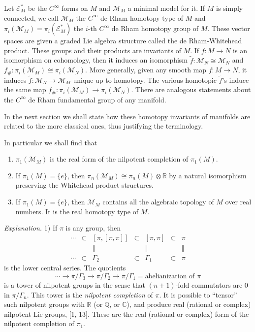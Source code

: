 \documentclass[
  english,
  a3paper,
  a3paper]{extarticle}
\begin{document}
Let \(\mathscr E_M^*\) be the \(C^\infty\) forms on \(M\) and
\(\mathcal M_M\) a minimal model for it. If \(M\) is simply connected,
we call \(\mathcal M_M\) the \(C^\infty\) de Rham homotopy type of \(M\)
and \(\pi_i(\mathcal M_M)=\pi_i(\mathscr E_M^*)\) the \(i\)-th
\(C^\infty\) de Rham homotopy group of \(M\). These vector spaces are
given a graded Lie algebra structure called the de Rham-Whitehead
product. These groups and their products are invariants of \(M\). If
\(f:M\to N\) is an isomorphism on cohomology, then it induces an
isomorphism \(\tilde f:\mathcal M_N\cong\mathcal M_N\) and
\(f_\#:\pi_i(\mathcal M_M)\cong\pi_i(\mathcal M_N)\). More generally,
given any smooth map \(f:M\to N\), it induces
\(\tilde f:\mathcal M_N\to\mathcal M_M\) unique up to homotopy. The
various homotopic \(\tilde f\)'s induce the same map
\(f_\#:\pi_i(\mathcal M_M)\to\pi_i(\mathcal M_N)\). There are analogous
statements about the \(C^\infty\) de Rham fundamental group of any
manifold.

In the next section we shall state how these homotopy invariants of
manifolds are related to the more classical ones, thus justifying the
terminology.

In particular we shall find that

\begin{enumerate}
\def\labelenumi{\arabic{enumi})}
\item
  \(\pi_1(\mathcal M_M)\) is the real form of the nilpotent completion
  of \(\pi_1(M)\).
\item
  If \(\pi_1(M)=\{e\}\), then
  \(\pi_n(\mathcal M_M)\cong\pi_n(M)\otimes\mathbb R\) by a natural
  isomorphism preserving the Whitehead product structures.
\item
  If \(\pi_1(M)=\{e\}\), then \(\mathcal M_M\) contains all the
  algebraic topology of \(M\) over real numbers. It is the real homotopy
  type of \(M\).
\end{enumerate}

\emph{Explanation.} 1) If \(\pi\) is any group, then \[
\begin{array}{ccccccc}
\cdots&\subset&[\pi,[\pi,\pi]]&\subset&[\pi,\pi]&\subset&\pi\\
&&\Vert&&\Vert&&\Vert\\
\cdots&\subset&\Gamma_2&\subset&\Gamma_1&\subset&\pi
\end{array}
\] is the lower central series. The quotients \[
\cdots\to\pi/\Gamma_3\to\pi/\Gamma_2\to\pi/\Gamma_1=\text{abelianization of }\pi
\] is a tower of nilpotent groups in the sense that \((n+1)\)-fold
commutators are 0 in \(\pi/\Gamma_n\). This tower is the \emph{nilpotent
completion} of \(\pi\). It is possible to ``tensor'' such nilpotent
groups with \(\mathbb R\) (or \(\mathbb Q\), or \(\mathbb C\)), and
produce real (rational or complex) nilpotent Lie groups, {[}1, 13{]}.
These are the real (rational or complex) form of the nilpotent
completion of \(\pi_1\).
\end{document}
